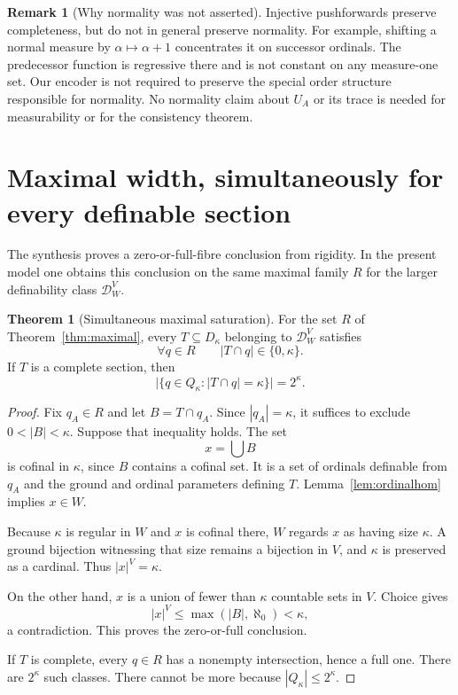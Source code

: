 \documentclass[11pt,letterpaper]{article}
\theoremstyle{definition}
\newtheorem{theorem}[definition]{Theorem}
\newtheorem{remark}[definition]{Remark}
\numberwithin{equation}{section}
\newcommand{\Dg}{\mathcal D_W^V}
\begin{document}
\begin{remark}[Why normality was not asserted]\label{rem:normality}
Injective pushforwards preserve completeness, but do not in general preserve normality. For example, shifting a normal measure by $\alpha\mapsto\alpha+1$ concentrates it on successor ordinals. The predecessor function is regressive there and is not constant on any measure-one set. Our encoder is not required to preserve the special order structure responsible for normality. No normality claim about $U_A$ or its trace is needed for measurability or for the consistency theorem.
\end{remark}

\section{Maximal width, simultaneously for every definable section}\label{sec:width}

The synthesis proves a zero-or-full-fibre conclusion from rigidity. In the present model one obtains this conclusion on the same maximal family $R$ for the larger definability class $\Dg$.

\begin{theorem}[Simultaneous maximal saturation]\label{thm:fullfibres}
For the set $R$ of Theorem~\ref{thm:maximal}, every $T\subseteq D_\kappa$ belonging to $\Dg$ satisfies
\[
\forall q\in R\qquad |T\cap q|\in\{0,\kappa\}.
\]
If $T$ is a complete section, then
\[
\bigl|\{q\in Q_\kappa:|T\cap q|=\kappa\}\bigr|=2^\kappa.
\]
\end{theorem}
\begin{proof}
Fix $q_A\in R$ and let $B=T\cap q_A$. Since $|q_A|=\kappa$, it suffices to exclude $0<|B|<\kappa$. Suppose that inequality holds. The set
\[
x=\bigcup B
\]
is cofinal in $\kappa$, since $B$ contains a cofinal set. It is a set of ordinals definable from $q_A$ and the ground and ordinal parameters defining $T$. Lemma~\ref{lem:ordinalhom} implies $x\in W$.

Because $\kappa$ is regular in $W$ and $x$ is cofinal there, $W$ regards $x$ as having size $\kappa$. A ground bijection witnessing that size remains a bijection in $V$, and $\kappa$ is preserved as a cardinal. Thus $|x|^V=\kappa$.

On the other hand, $x$ is a union of fewer than $\kappa$ countable sets in $V$. Choice gives
\[
|x|^V\le\max(|B|,\aleph_0)<\kappa,
\]
a contradiction. This proves the zero-or-full conclusion.

If $T$ is complete, every $q\in R$ has a nonempty intersection, hence a full one. There are $2^\kappa$ such classes. There cannot be more because $|Q_\kappa|\le2^\kappa$.
\end{proof}
\end{document}

